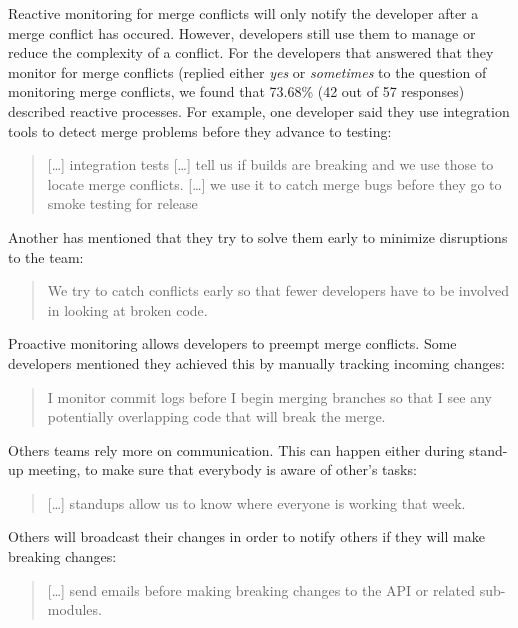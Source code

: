 Reactive monitoring for merge conflicts will only notify the developer after a merge conflict has occured.
However, developers still use them to manage or reduce the complexity of a conflict.
For the developers that answered that they monitor for merge conflicts (replied either \emph{yes} or \emph{sometimes} to the question of monitoring merge conflicts, we found that 73.68\% (42 out of 57 responses) described reactive processes.
For example, one developer said they use integration tools to detect merge problems before they advance to testing:
\begin{quotation}
	[\ldots] integration tests [\ldots] tell us if builds are breaking and we use those to locate merge conflicts. [\ldots] we use it to catch merge bugs before they go to smoke testing for release
\end{quotation}
Another has mentioned that they try to solve them early to minimize disruptions to the team:
\begin{quotation}
	We try to catch conflicts early so that fewer developers have to be involved in looking at broken code.
\end{quotation}

Proactive monitoring allows developers to preempt merge conflicts.
Some developers mentioned they achieved this by manually tracking incoming changes:
\begin{quotation}
	I monitor commit logs before I begin merging branches so that I see any potentially overlapping code that will break the merge.
\end{quotation}
Others teams rely more on communication.
This can happen either during stand-up meeting, to make sure that everybody is aware of other's tasks:
\begin{quotation}
	[\ldots] standups allow us to know where everyone is working that week.
\end{quotation}
Others will broadcast their changes in order to notify others if they will make breaking changes:
\begin{quotation}
	[\ldots] send emails before making breaking changes to the API or related sub-modules.
\end{quotation}

